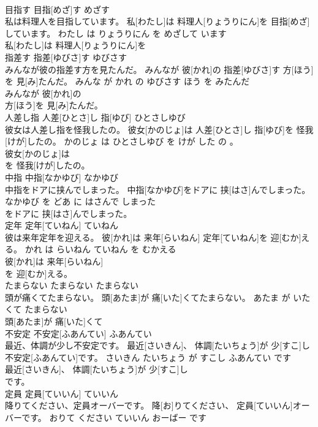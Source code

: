 \documentclass[8pt]{extreport}
\begin{document}
\begin{CJK}{UTF8}{min}
\\	目指す	目指[めざ]す	めざす	
\\	私は料理人を目指しています。	私[わたし]は 料理人[りょうりにん]を 目指[めざ]しています。	わたし は りょうりにん を めざして います	
\\	私[わたし]は 料理人[りょうりにん]を
\\	指差す	指差[ゆびさ]す	ゆびさす	
\\	みんなが彼の指差す方を見たんだ。	みんなが 彼[かれ]の 指差[ゆびさ]す 方[ほう]を 見[み]たんだ。	みんな が かれ の ゆびさす ほう を みたんだ	
\\	みんなが 彼[かれ]の
\\	方[ほう]を 見[み]たんだ。			
\\	人差し指	人差[ひとさ]し 指[ゆび]	ひとさしゆび	
\\	彼女は人差し指を怪我したの。	彼女[かのじょ]は 人差[ひとさ]し 指[ゆび]を 怪我[けが]したの。	かのじょ は ひとさしゆび を けが した の 。	
\\	彼女[かのじょ]は
\\	を 怪我[けが]したの。			
\\	中指	中指[なかゆび]	なかゆび	
\\	中指をドアに挟んでしまった。	中指[なかゆび]をドアに 挟[はさ]んでしまった。	なかゆび を どあ に はさんで しまった	
\\	をドアに 挟[はさ]んでしまった。			
\\	定年	定年[ていねん]	ていねん	
\\	彼は来年定年を迎える。	彼[かれ]は 来年[らいねん] 定年[ていねん]を 迎[むか]える。	かれ は らいねん ていねん を むかえる	
\\	彼[かれ]は 来年[らいねん]
\\	を 迎[むか]える。			
\\	たまらない	たまらない	たまらない	
\\	頭が痛くてたまらない。	頭[あたま]が 痛[いた]くてたまらない。	あたま が いたくて たまらない	
\\	頭[あたま]が 痛[いた]くて
\\	不安定	不安定[ふあんてい]	ふあんてい	
\\	最近、体調が少し不安定です。	最近[さいきん]、 体調[たいちょう]が 少[すこ]し 不安定[ふあんてい]です。	さいきん たいちょう が すこし ふあんてい です	
\\	最近[さいきん]、 体調[たいちょう]が 少[すこ]し
\\	です。			
\\	定員	定員[ていいん]	ていいん	
\\	降りてください、定員オーバーです。	降[お]りてください、 定員[ていいん]オーバーです。	おりて ください ていいん おーばー です	

\end{CJK}
\end{document}
